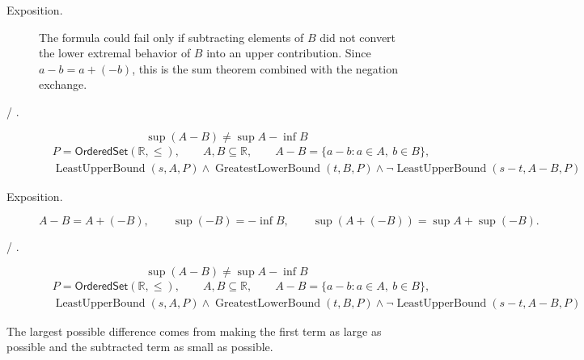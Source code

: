 \begin{remark*}
\begin{description}
  \item[Exposition.]
The formula could fail only if subtracting elements of $B$ did not convert the lower extremal behavior of $B$ into an upper contribution. Since $a-b=a+(-b)$, this is the sum theorem combined with the negation exchange.


  \item[ / .]
  \[
\sup(A-B)\ne \sup A-\inf B
\]
\[
\begin{aligned}
&P=\mathsf{OrderedSet}(\mathbb{R},\leq),\qquad A,B\subseteq\mathbb{R},\qquad A-B=\{a-b:a\in A,\ b\in B\},\\
&\operatorname{LeastUpperBound}(s,A,P)\land \operatorname{GreatestLowerBound}(t,B,P)
\land
\neg\operatorname{LeastUpperBound}(s-t,A-B,P)
\end{aligned}
\]
\end{description}
\end{remark*}

\begin{remark*}
\begin{description}
  \item[Exposition.]
\[
A-B=A+(-B),
\qquad
\sup(-B)=-\inf B,
\qquad
\sup(A+(-B))=\sup A+\sup(-B).
\]


  \item[ / .]
  \[
\sup(A-B)\ne \sup A-\inf B
\]
\[
\begin{aligned}
&P=\mathsf{OrderedSet}(\mathbb{R},\leq),\qquad A,B\subseteq\mathbb{R},\qquad A-B=\{a-b:a\in A,\ b\in B\},\\
&\operatorname{LeastUpperBound}(s,A,P)\land \operatorname{GreatestLowerBound}(t,B,P)
\land
\neg\operatorname{LeastUpperBound}(s-t,A-B,P)
\end{aligned}
\]
\end{description}
\end{remark*}

\begin{remark*}[Interpretation]
The largest possible difference comes from making the first term as large as possible and the subtracted term as small as possible.
\end{remark*}

